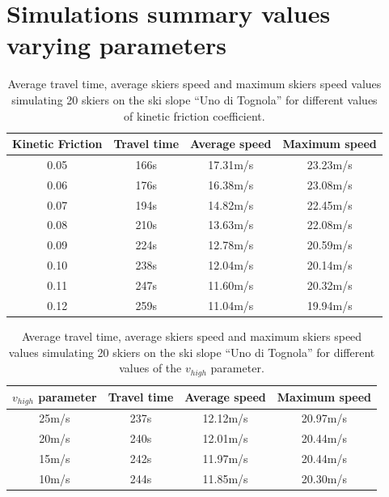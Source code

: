 \documentclass[12pt,a4paper,twoside]{book}
\begin{document}
\chapter{Simulations summary values varying parameters}
\begin{table}[h]
  \centering
  \begin{tabular}{ | c | c | c | c | }
    \hline
    Kinetic Friction & Travel time & Average speed & Maximum speed \\
    \hline
    0.05 & 166s & 17.31m/s & 23.23m/s \\
    \hline
    0.06 & 176s & 16.38m/s & 23.08m/s \\
    \hline
    0.07 & 194s & 14.82m/s & 22.45m/s \\
    \hline
    0.08 & 210s & 13.63m/s & 22.08m/s \\
    \hline
    0.09 & 224s & 12.78m/s & 20.59m/s \\
    \hline
    0.10 & 238s & 12.04m/s & 20.14m/s \\
    \hline
    0.11 & 247s & 11.60m/s & 20.32m/s \\
    \hline
    0.12 & 259s & 11.04m/s & 19.94m/s \\
    \hline
  \end{tabular}
  \caption{Average travel time, average skiers speed and maximum skiers speed values simulating 20 skiers on the ski slope ``Uno di Tognola'' for different values of kinetic friction coefficient.}
\end{table}
\begin{table}
  \centering
  \begin{tabular}{ | c | c | c | c | }
    \hline
    ${v_{high}}$ parameter & Travel time & Average speed & Maximum speed \\
    \hline
    25m/s & 237s & 12.12m/s & 20.97m/s \\
    \hline
    20m/s & 240s & 12.01m/s & 20.44m/s \\
    \hline
    15m/s & 242s & 11.97m/s & 20.44m/s \\
    \hline
    10m/s & 244s & 11.85m/s & 20.30m/s \\
    \hline
  \end{tabular}
  \caption{Average travel time, average skiers speed and maximum skiers speed values simulating 20 skiers on the ski slope ``Uno di Tognola'' for different values of the ${v_{high}}$ parameter.}
\end{table}
\newpage
\thispagestyle{plain}
\end{document}
